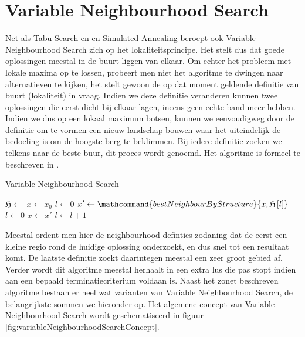 \section{Variable Neighbourhood Search}
\label{ss:variableNeighbourhoodSearch}
Net als Tabu Search en en Simulated Annealing beroept ook Variable Neighbourhood Search zich op het lokaliteitsprincipe. Het stelt dus dat goede oplossingen meestal in de buurt liggen van elkaar. Om echter het probleem met lokale maxima op te lossen, probeert men niet het algoritme te dwingen naar alternatieven te kijken, het stelt gewoon de op dat moment geldende definitie van buurt (lokaliteit) in vraag. Indien we deze definitie veranderen kunnen twee oplossingen die eerst dicht bij elkaar lagen, ineens geen echte band meer hebben. Indien we dus op een lokaal maximum botsen, kunnen we eenvoudigweg door de definitie om te vormen een nieuw landschap bouwen waar het uiteindelijk de bedoeling is om de hoogste berg te beklimmen. Bij iedere definitie zoeken we telkens naar de beste buur, dit proces wordt  genoemd. Het algoritme is formeel te beschreven in .
\begin{algorithm}[htb]                      %
\caption{Variable Neighbourhood Search}          %
\label{alg:variableNeighbourhoodSearch}                           %
\begin{algorithmic}[1]                    %
\STATE $\mathfrak{H}\leftarrow$
\STATE $x\leftarrow x_0$
\STATE $l\leftarrow 0$
\STATE $x'\leftarrow\mathcommand{bestNeighbourByStructure}{x,\mathfrak{H}\left[l\right]}$
\STATE $l\leftarrow 0$
\STATE $x\leftarrow x'$
\ELSE
\STATE $l\leftarrow l+1$
\ENDIF
\ENDWHILE
\end{algorithmic}
\end{algorithm}
Meestal ordent men hier de neighbourhood definties zodaning dat de eerst een kleine regio rond de huidige oplossing onderzoekt, en dus snel tot een resultaat komt. De laatste definitie zoekt daarintegen meestal een zeer groot gebied af. Verder wordt dit algoritme meestal herhaalt in een extra lus die pas stopt indien aan een bepaald terminatiecriterium voldaan is. Naast het zonet beschreven algoritme bestaan er heel wat varianten van Variable Neighbourhood Search, de belangrijkste sommen we hieronder op. Het algemene concept van Variable Neighbourhood Search wordt geschematiseerd in figuur \ref{fig:variableNeighbourhoodSearchConcept}.
